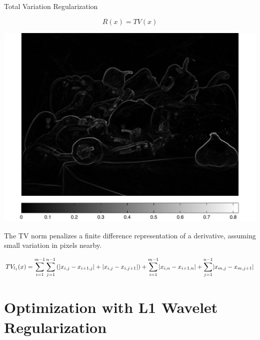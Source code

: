 \documentclass[12pt]{beamer}
\DeclarePairedDelimiter{\abs}{\lvert}{\rvert}
\begin{document}
\begin{frame}{Total Variation Regularization}

\vspace{-4ex}
\[ R(x) = TV(x) \]

\vspace{2ex}
\begin{minipage}[T]{0.45\textwidth}
	\begin{center}
	\includegraphics[width=1\textwidth]{../figures/diff.pdf} \\
	
	\end{center}
\end{minipage}
\begin{minipage}[T]{0.5\textwidth}
The TV norm penalizes a finite difference representation of a derivative, assuming small variation in pixels nearby. \\[4ex]
\end{minipage}
\tiny $$ TV_{l_1}(x) = \sum_{i=1}^{m-1} \sum_{j=1}^{n-1} \left( \abs{x_{i,j}  - x_{i+1,j} } + \abs{ x_{i,j} - x_{i,j+1}  } \right) + \sum_{i=1}^{m-1} \abs{ x_{i,n} - x_{i+1,n} } + \sum_{j=1}^{n-1} \abs{ x_{m,j} - x_{m,j+1 } }$$
\end{frame}

\section{Optimization with L1 Wavelet Regularization}
\end{document}
